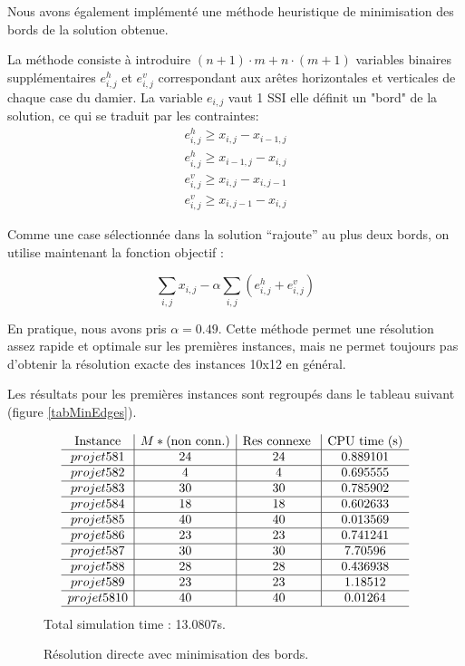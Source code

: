 \documentclass[12pt,a4paper]{article}
\begin{document}
Nous avons également implémenté une méthode heuristique de minimisation des bords de la solution obtenue.

La méthode consiste à introduire $(n+1) \cdot m + n\cdot (m+1) $ variables binaires supplémentaires $e^h_{i,j}$ et $e^v_{i,j}$ correspondant aux arêtes horizontales et verticales de chaque case du damier. La variable $e_{i,j}$ vaut 1 SSI elle définit un "bord" de la solution, ce qui se traduit par les contraintes: 
\begin{align}
e^h_{i,j}\geq x_{i,j} - x_{i-1,j} \\
e^h_{i,j}\geq x_{i-1,j} - x_{i,j} \\
e^v_{i,j}\geq x_{i,j} - x_{i,j-1} \\
e^v_{i,j}\geq x_{i,j-1} - x_{i,j}
\end{align}

Comme une case sélectionnée dans la solution ``rajoute'' au plus deux bords, on utilise maintenant la fonction objectif :

$$ \sum_{i,j} x_{i,j} - \alpha \sum_{i,j} \left( e^h_{i,j} + e^v_{i,j} \right)$$

En pratique, nous avons pris $\alpha= 0.49$.
Cette méthode permet une résolution assez rapide et optimale sur les premières instances, mais ne permet toujours pas d'obtenir la résolution exacte des instances 10x12 en général.

Les résultats pour les premières instances sont regroupés dans le tableau suivant (figure \ref{tabMinEdges}).


\begin{figure}
\centering

\[
\begin{array}{c|c|c|c}
\text{Instance} & M* \text{(non conn.)} & \text{Res connexe }& \text{CPU time (s)} \\\hline
projet 5 8 1 &24 & 24 & 0.889101\\ \hline
projet 5 8 2 &4 & 4 & 0.695555\\ \hline
projet 5 8 3 &30 & 30 & 0.785902\\ \hline
projet 5 8 4 &18 & 18 & 0.602633\\ \hline
projet 5 8 5 &40 & 40 & 0.013569\\ \hline
projet 5 8 6 &23 & 23 & 0.741241\\ \hline
projet 5 8 7 &30 & 30 & 7.70596\\ \hline
projet 5 8 8 &28 & 28 & 0.436938\\ \hline
projet 5 8 9 &23 & 23 & 1.18512\\ \hline
projet 5 8 10 &40 & 40 & 0.01264\\ \hline
\end{array}\]
Total simulation time : 13.0807s.
\caption{Résolution directe avec minimisation des bords.}
\end{figure}
\end{document}
